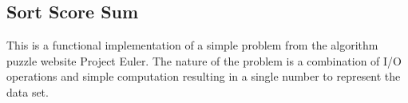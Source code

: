 \subsection{Sort Score Sum}
This is a functional implementation of a simple problem from the algorithm puzzle website Project Euler.  The nature of the problem is a combination of I/O operations and simple computation resulting in a single number to represent the data set.  %